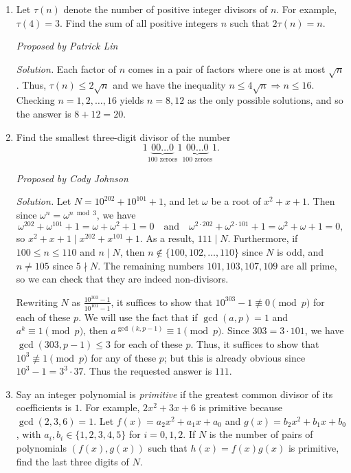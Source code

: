 \documentclass[10pt]{article}
\newcounter{enum}
\newcommand{\proposed}[1]
{
\vspace{5pt}
\noindent\textit{Proposed by #1}
}
\newcommand{\solution}
{
\vspace{5pt}
\noindent\textit{Solution.}\qquad
}
\begin{document}
\begin{enumerate}
	\item Let $\tau(n)$ denote the number of positive integer divisors of $n$. For example, $\tau(4) = 3$. Find the sum of all positive integers $n$ such that $2 \tau(n) = n$.

	\proposed{Patrick Lin}

	\solution Each factor of $n$ comes in a pair of factors where one is at most $\sqrt{n}$. Thus, $\tau(n) \leq 2 \sqrt{n}$ and we have the inequality $n \leq 4 \sqrt{n} \Rightarrow n \leq 16$. Checking $n = 1, 2, \ldots, 16$ yields $n = 8, 12$ as the only possible solutions, and so the answer is $8 + 12 = 20$.
	
	\item Find the smallest three-digit divisor of the number \[1\underbrace{00\ldots 0}_{100\text{ zeroes}}1\underbrace{00\ldots 0}_{100\text{ zeroes}}1.\]
	
	\proposed{Cody Johnson}
	
	\solution Let $N=10^{202}+10^{101}+1$, and let $\omega$ be a root of $x^2+x+1$.  Then since $\omega^n = \omega^{n\bmod 3}$, we have \[\omega^{202}+\omega^{101}+1=\omega+\omega^2+1=0\quad\text{and}\quad \omega^{2\cdot 202}+\omega^{2\cdot 101}+1 = \omega^2+\omega+1 = 0,\] so $x^2+x+1\mid x^{202}+x^{101}+1$.  As a result, $111 \mid N$.  Furthermore, if $100\leq n\leq 110$ and $n\mid N$, then $n\not\in\{100,102,\ldots, 110\}$ since $N$ is odd, and $n\neq 105$ since $5\nmid N$.  The remaining numbers $101,103,107,109$ are all prime, so we can check that they are indeed non-divisors.
	
	\par Rewriting $N$ as $\tfrac{10^{303}-1}{10^{101}-1}$, it suffices to show that $10^{303}-1\not\equiv 0\pmod p$ for each of these $p$.  We will use the fact that if $\gcd(a,p) = 1$ and $a^k\equiv 1\pmod p$, then $a^{\gcd(k,p-1)}\equiv 1\pmod p$.  Since $303 = 3\cdot 101$, we have $\gcd(303,p-1)\leq 3$ for each of these $p$.  Thus, it suffices to show that $10^3\not\equiv 1\pmod p$ for any of these $p$; but this is already obvious since $10^3 - 1 = 3^3\cdot 37$.  Thus the requested answer is $\boxed{111}$.
	
	\item Say an integer polynomial is \textit{primitive} if the greatest common divisor of its coefficients is $1$.  For example, $2x^2+3x+6$ is primitive because $\gcd(2,3,6)=1$.  Let $f(x)=a_2x^2+a_1x+a_0$ and $g(x) = b_2x^2+b_1x+b_0$, with $a_i,b_i\in\{1,2,3,4,5\}$ for $i=0,1,2$.  If $N$ is the number of pairs of polynomials $(f(x),g(x))$ such that $h(x) = f(x)g(x)$ is primitive, find the last three digits of $N$.\\


\end{enumerate}
\end{document}
